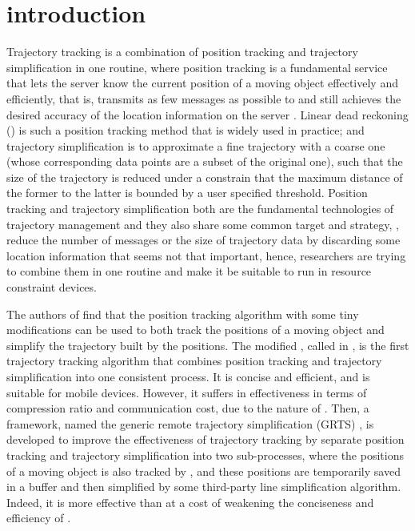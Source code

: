 

\section{introduction}
\label{sec-intro}


Trajectory tracking \cite{Lange:Tracking} is a combination of position tracking \cite{Wolfson:PositionTracking,Leonhardi:Comparison} and trajectory simplification \cite{Lin:Cised,Zhang:Evaluation} in one routine, where position tracking is a fundamental service that lets the server know the current position of a moving object effectively and efficiently, that is, transmits as few messages
as possible to and still achieves the desired accuracy of the location information on the server \cite{Leonhardi:Comparison}. Linear dead reckoning (\ldr) \cite{Wolfson:PositionTracking} is such a position tracking method that is widely used in practice;
%
and trajectory simplification \cite{Lin:Cised,Zhang:Evaluation} is to approximate a fine trajectory with a coarse one (whose corresponding data points are a subset of the original one), such that the size of the trajectory is reduced under a constrain that the maximum distance of the former to the latter is bounded by a user specified threshold. 
%
Position tracking and trajectory simplification both are the fundamental technologies of trajectory management and they also share some common target and strategy, \ie, reduce the number of messages or the size of trajectory data by discarding some location information that seems not that important, hence, researchers are trying to combine them in one routine and make it be suitable to run in resource constraint devices.

The authors of \cite{Trajcevski:LDRH} find that the position tracking algorithm \ldr with some tiny modifications can be used to both track the positions of a moving object and simplify the trajectory built by the positions. The modified \ldr,  called \ldrh in \cite{Lange:Tracking}, is the first trajectory tracking algorithm that combines position tracking and trajectory simplification into one consistent process. It is concise and efficient, and is suitable for mobile devices. However, it suffers in effectiveness in terms of compression ratio and communication cost, due to the nature of \ldr. 
%
Then, a framework, named the generic remote trajectory simplification (GRTS) \cite{Lange:GRTS,Lange:Tracking}, is developed to improve the effectiveness of trajectory tracking by separate position tracking and trajectory simplification into two sub-processes, where the positions of a moving object is also tracked by \ldr, and these positions are temporarily saved in a buffer and then simplified by some third-party line simplification algorithm. Indeed, it is more effective than \ldrh at a cost of weakening the conciseness and efficiency of \ldrh.
%



